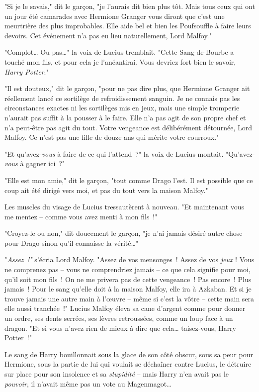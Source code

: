 "Si je le savais," dit le garçon, "je l'aurais dit bien plus tôt. Mais tous ceux qui ont un jour été camarades avec Hermione Granger vous diront que c'est une meurtrière des plus improbables. Elle aide bel et bien les Poufsouffle à faire leurs devoirs. Cet événement n'a pas eu lieu naturellement, Lord Malfoy."

"Complot… Ou pas…" la voix de Lucius tremblait. "Cette Sang-de-Bourbe a touché mon fils, et pour cela je l'anéantirai. Vous devriez fort bien le savoir, \emph{Harry Potter}."

"Il est douteux," dit le garçon, "pour ne pas dire plus, que Hermione Granger ait réellement lancé ce sortilège de refroidissement sanguin. Je ne connais pas les circonstances exactes ni les sortilèges mis en jeux, mais une simple tromperie n'aurait pas suffit à la pousser à le faire. Elle n'a pas agit de son propre chef et n'a peut-être pas agit du tout. Votre vengeance est délibérément détournée, Lord Malfoy. Ce n'est pas une fille de douze ans qui mérite votre courroux."

"Et qu'avez-\emph{vous} à faire de ce qui l'attend~?" la voix de Lucius montait. "Qu'avez-\emph{vous} à gagner ici~?"

"Elle est mon amie," dit le garçon, "tout comme Drago l'est. Il est possible que ce coup ait été dirigé vers moi, et pas du tout vers la maison Malfoy."

Les muscles du visage de Lucius tressautèrent à nouveau. "Et maintenant vous me mentez -- comme vous avez menti à mon fils~!"

"Croyez-le ou non," dit doucement le garçon, "je n'ai jamais désiré autre chose pour Drago sinon qu'il connaisse la vérité…"

"\emph{Assez~!"} s'écria Lord Malfoy. "Assez de vos mensonges~! Assez de vos \emph{jeux} ! Vous ne comprenez pas -- vous ne comprendriez jamais -- ce que cela signifie pour moi, qu'il soit mon fils~! On ne me privera pas de cette vengeance~! Pas encore~! Plus jamais~! Pour le sang qu'elle doit à la maison Malfoy, elle ira à Azkaban. Et si je trouve jamais une autre main à l'œuvre -- même si c'est la vôtre -- cette main sera elle aussi tranchée~!" Lucius Malfoy éleva sa cane d'argent comme pour donner un ordre, ses dents serrées, ses lèvres retroussées, comme un loup face à un dragon. "Et si vous n'avez rien de mieux à dire que cela… taisez-vous, Harry Potter~!"

\later

Le sang de Harry bouillonnait sous la glace de son côté obscur, sous sa peur pour Hermione, sous la partie de lui qui voulait se déchaîner contre Lucius, le détruire sur place pour son insolence et sa \emph{stupidité} -- mais Harry n'en avait pas le \emph{pouvoir}, il n'avait même pas un vote au Magenmagot…

